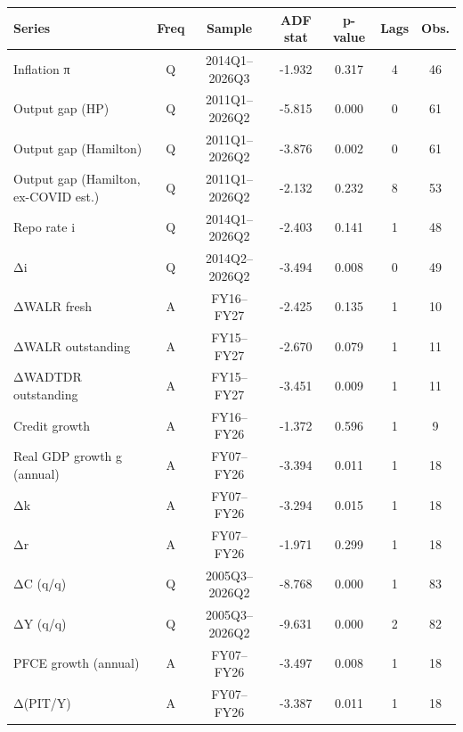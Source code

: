 \begin{tabular}{lcccccc}
\toprule
Series & Freq & Sample & ADF stat & p-value & Lags & Obs. \\
\midrule
Inflation π & Q & 2014Q1–2026Q3 & -1.932 & 0.317 & 4 & 46 \\
Output gap (HP) & Q & 2011Q1–2026Q2 & -5.815 & 0.000 & 0 & 61 \\
Output gap (Hamilton) & Q & 2011Q1–2026Q2 & -3.876 & 0.002 & 0 & 61 \\
Output gap (Hamilton, ex-COVID est.) & Q & 2011Q1–2026Q2 & -2.132 & 0.232 & 8 & 53 \\
Repo rate i & Q & 2014Q1–2026Q2 & -2.403 & 0.141 & 1 & 48 \\
Δi & Q & 2014Q2–2026Q2 & -3.494 & 0.008 & 0 & 49 \\
ΔWALR fresh & A & FY16–FY27 & -2.425 & 0.135 & 1 & 10 \\
ΔWALR outstanding & A & FY15–FY27 & -2.670 & 0.079 & 1 & 11 \\
ΔWADTDR outstanding & A & FY15–FY27 & -3.451 & 0.009 & 1 & 11 \\
Credit growth & A & FY16–FY26 & -1.372 & 0.596 & 1 & 9 \\
Real GDP growth g (annual) & A & FY07–FY26 & -3.394 & 0.011 & 1 & 18 \\
Δk & A & FY07–FY26 & -3.294 & 0.015 & 1 & 18 \\
Δr & A & FY07–FY26 & -1.971 & 0.299 & 1 & 18 \\
ΔC (q/q) & Q & 2005Q3–2026Q2 & -8.768 & 0.000 & 1 & 83 \\
ΔY (q/q) & Q & 2005Q3–2026Q2 & -9.631 & 0.000 & 2 & 82 \\
PFCE growth (annual) & A & FY07–FY26 & -3.497 & 0.008 & 1 & 18 \\
Δ(PIT/Y) & A & FY07–FY26 & -3.387 & 0.011 & 1 & 18 \\
\bottomrule
\end{tabular}
